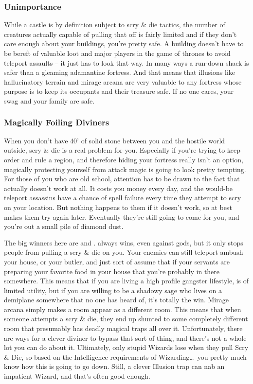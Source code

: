 \subsubsection{Unimportance}

While a castle is by definition subject to scry \& die tactics, the number of creatures actually capable of pulling that off is fairly limited and if they don't care enough about your buildings, you're pretty safe. A building doesn't have to be bereft of valuable loot and major players in the game of thrones to avoid teleport assaults -- it just has to look that way. In many ways a run-down shack is safer than a gleaming adamantine fortress. And that means that illusions like hallucinatory terrain and mirage arcana are very valuable to any fortress whose purpose is to keep its occupants and their treasure safe. If no one cares, your swag and your family are safe.

\subsubsection{Magically Foiling Diviners}

When you don't have 40' of solid stone between you and the hostile world outside, scry \& die is a real problem for you. Especially if you're trying to keep order and rule a region, and therefore hiding your fortress really isn't an option, magically protecting yourself from attack magic is going to look pretty tempting. For those of you who are old school, attention has to be drawn to the fact that  actually doesn't work at all. It costs you money every day, and the would-be teleport assassins have a chance of spell failure every time they attempt to scry on your location. But nothing happens to them if it doesn't work, so at best  makes them try again later. Eventually they're still going to come for you, and you're out a small pile of diamond dust.

The big winners here are  and .  always wins, even against gods, but it only stops people from pulling a scry \& die on you. Your enemies can still teleport ambush your house, or your butler, and just sort of assume that if your servants are preparing your favorite food in your house that you're probably in there somewhere. This means that if you are living a high profile gangster lifestyle,  is of limited utility, but if you are willing to be a shadowy sage who lives on a demiplane somewhere that no one has heard of, it's totally the win. Mirage arcana simply makes a room appear as a different room. This means that when someone attempts a scry \& die, they end up shunted to some completely different room that presumably has deadly magical traps all over it. Unfortunately, there are ways for a clever diviner to bypass that sort of thing, and there's not a whole lot you can do about it. Ultimately, only stupid Wizards lose when they pull Scry \& Die, so based on the Intelligence requirements of Wizarding\ldots\  you pretty much know how this is going to go down. Still, a clever Illusion trap can nab an impatient Wizard, and that's often good enough.

